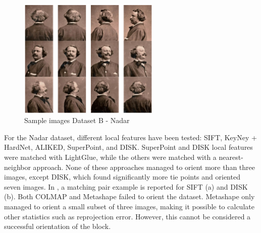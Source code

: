 \begin{figure}
    \centering
    \includegraphics[width=0.6\textwidth]{nadar_images}
    \caption{Sample images Dataset B - Nadar}
    \label{fig:5:nadar_images}
\end{figure}

For the Nadar dataset, different local features have been tested: SIFT, KeyNey + HardNet, ALIKED, SuperPoint, and DISK.
SuperPoint and DISK local features were matched with LightGlue, while the others were matched with a nearest-neighbor approach. 
None of these approaches managed to orient more than three images, except DISK, which found significantly more tie points and oriented seven images. 
In , a matching pair example is reported for SIFT (a) and DISK (b).
Both COLMAP and Metashape failed to orient the dataset.
Metashape only managed to orient a small subset of three images, making it possible to calculate other statistics such as reprojection error. 
However, this cannot be considered a successful orientation of the block. 


